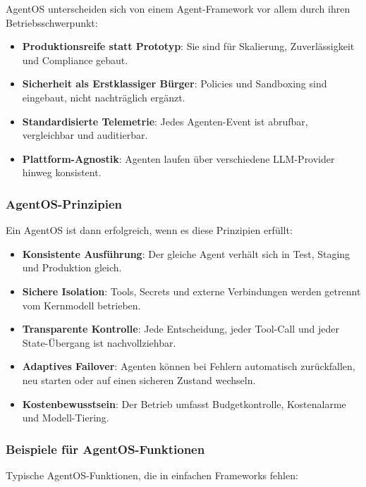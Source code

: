 AgentOS unterscheiden sich von einem Agent-Framework vor allem durch ihren Betriebsschwerpunkt:

\begin{itemize}[leftmargin=*]
    \item \textbf{Produktionsreife statt Prototyp}: Sie sind für Skalierung, Zuverlässigkeit und Compliance gebaut.
    \item \textbf{Sicherheit als Erstklassiger Bürger}: Policies und Sandboxing sind eingebaut, nicht nachträglich ergänzt.
    \item \textbf{Standardisierte Telemetrie}: Jedes Agenten-Event ist abrufbar, vergleichbar und auditierbar.
    \item \textbf{Plattform-Agnostik}: Agenten laufen über verschiedene LLM-Provider hinweg konsistent.
\end{itemize}

\subsubsection{AgentOS-Prinzipien}

Ein AgentOS ist dann erfolgreich, wenn es diese Prinzipien erfüllt:

\begin{itemize}[leftmargin=*]
    \item \textbf{Konsistente Ausführung}: Der gleiche Agent verhält sich in Test, Staging und Produktion gleich.
    \item \textbf{Sichere Isolation}: Tools, Secrets und externe Verbindungen werden getrennt vom Kernmodell betrieben.
    \item \textbf{Transparente Kontrolle}: Jede Entscheidung, jeder Tool-Call und jeder State-Übergang ist nachvollziehbar.
    \item \textbf{Adaptives Failover}: Agenten können bei Fehlern automatisch zurückfallen, neu starten oder auf einen sicheren Zustand wechseln.
    \item \textbf{Kostenbewusstsein}: Der Betrieb umfasst Budgetkontrolle, Kostenalarme und Modell-Tiering.
\end{itemize}

\subsubsection{Beispiele für AgentOS-Funktionen}

Typische AgentOS-Funktionen, die in einfachen Frameworks fehlen:

